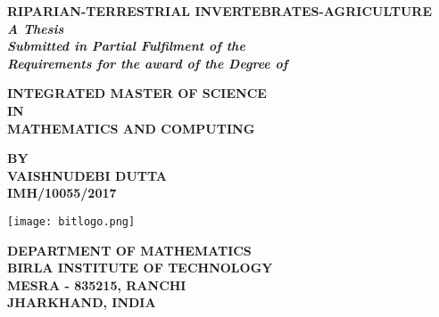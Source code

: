 \documentclass[12pt,a4wide]{report}
\date{}
\numberwithin{equation}{chapter}
\numberwithin{theorem}{chapter}
\begin{document}
\begin{titlepage}
\begin{center}
\textbf{\Large RIPARIAN-TERRESTRIAL INVERTEBRATES-AGRICULTURE}\\
\textit{\textbf{ A Thesis  \\
	Submitted in Partial Fulfilment of the  \\
	Requirements for the award of the Degree of} \\[5pt]}

{\normalsize \bf INTEGRATED MASTER OF SCIENCE}\\[5pt]
{\normalsize \bf IN}\\
{\normalsize \bf MATHEMATICS AND COMPUTING}

{\normalsize \textbf{BY\\
VAISHNUDEBI DUTTA\\
IMH/10055/2017}}

\vspace{2cm}
\texttt{[image: bitlogo.png]}

{\normalsize \textbf{DEPARTMENT OF MATHEMATICS \\
BIRLA INSTITUTE OF TECHNOLOGY\\
MESRA - 835215, RANCHI\\
JHARKHAND, INDIA}}
\end{center}
\end{titlepage}
\end{document}
